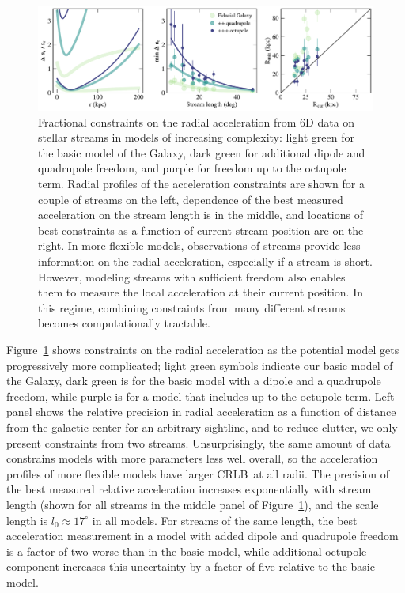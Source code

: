 \documentclass[modern]{aastex62}
\newcommand{\acronym}[1]{{\small{#1}}}
\newcommand{\CRLB}{\acronym{CRLB}}
\begin{document}
\begin{figure}
\begin{center}
\includegraphics[width=\textwidth]{ar_crb_all.pdf}
\caption{
Fractional constraints on the radial acceleration from 6D data on stellar streams in models of increasing complexity: light green for the basic model of the Galaxy, dark green for additional dipole and quadrupole freedom, and purple for freedom up to the octupole term.
Radial profiles of the acceleration constraints are shown for a couple of streams on the left, dependence of the best measured acceleration on the stream length is in the middle, and locations of best constraints as a function of current stream position are on the right.
In more flexible models, observations of streams provide less information on the radial acceleration, especially if a stream is short.
However, modeling streams with sufficient freedom also enables them to measure the local acceleration at their current position.
In this regime, combining constraints from many different streams becomes computationally tractable.
}
\label{fig:ar_all}
\end{center}
\end{figure}

Figure~\ref{fig:ar_all} shows constraints on the radial acceleration as the potential model gets progressively more complicated; light green symbols indicate our basic model of the Galaxy, dark green is for the basic model with a dipole and a quadrupole freedom, while purple is for a model that includes up to the octupole term.
Left panel shows the relative precision in radial acceleration as a function of distance from the galactic center for an arbitrary sightline, and to reduce clutter, we only present constraints from two streams.
Unsurprisingly, the same amount of data constrains models with more parameters less well overall, so the acceleration profiles of more flexible models have larger \CRLB\ at all radii. 
The precision of the best measured relative acceleration increases exponentially with stream length (shown for all streams in the middle panel of Figure~\ref{fig:ar_all}), and the scale length is $l_0\approx17^\circ$ in all models.
For streams of the same length, the best acceleration measurement in a model with added dipole and quadrupole freedom is a factor of two worse than in the basic model, while additional octupole component increases this uncertainty by a factor of five relative to the basic model.
\end{document}
